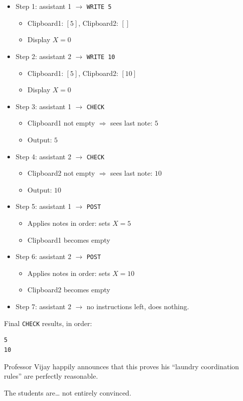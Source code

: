 \begin{itemize}
    \item Step 1: assistant 1 \(\rightarrow\) \texttt{WRITE 5}
    \begin{itemize}
        \item Clipboard1: \([5]\), Clipboard2: \([]\)
        \item Display \(X = 0\)
    \end{itemize}

    \item Step 2: assistant 2 \(\rightarrow\) \texttt{WRITE 10}
    \begin{itemize}
        \item Clipboard1: \([5]\), Clipboard2: \([10]\)
        \item Display \(X = 0\)
    \end{itemize}

    \item Step 3: assistant 1 \(\rightarrow\) \texttt{CHECK}
    \begin{itemize}
        \item Clipboard1 not empty \(\Rightarrow\) sees last note: \(5\)
        \item Output: \(5\)
    \end{itemize}

    \item Step 4: assistant 2 \(\rightarrow\) \texttt{CHECK}
    \begin{itemize}
        \item Clipboard2 not empty \(\Rightarrow\) sees last note: \(10\)
        \item Output: \(10\)
    \end{itemize}

    \item Step 5: assistant 1 \(\rightarrow\) \texttt{POST}
    \begin{itemize}
        \item Applies notes in order: sets \(X = 5\)
        \item Clipboard1 becomes empty
    \end{itemize}

    \item Step 6: assistant 2 \(\rightarrow\) \texttt{POST}
    \begin{itemize}
        \item Applies notes in order: sets \(X = 10\)
        \item Clipboard2 becomes empty
    \end{itemize}

    \item Step 7: assistant 2 \(\rightarrow\) no instructions left, does
    nothing.
\end{itemize}

Final \texttt{CHECK} results, in order:
\begin{verbatim}
5
10
\end{verbatim}

Professor Vijay happily announces that this proves his ``laundry coordination
rules'' are perfectly reasonable.

The students are\ldots{} not entirely convinced.
